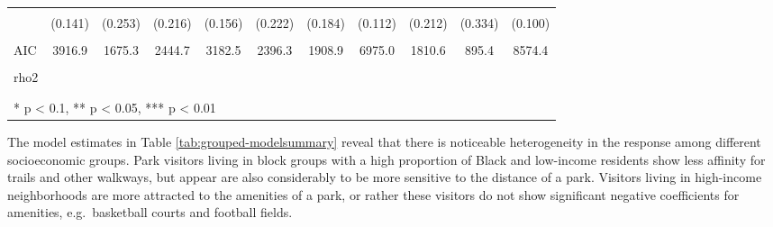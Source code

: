 \documentclass[3p, authoryear]{elsarticle} %
\begin{document}
\begin{landscape}
\begin{table}
{\begin{tabular}[t]{lcccccccccc}
\cellcolor{gray!6}{Other Sport} & \cellcolor{gray!6}{-0.036} & \cellcolor{gray!6}{-0.201} & \cellcolor{gray!6}{-0.417*} & \cellcolor{gray!6}{-0.125} & \cellcolor{gray!6}{-0.495**} & \cellcolor{gray!6}{0.010} & \cellcolor{gray!6}{-0.133} & \cellcolor{gray!6}{0.268} & \cellcolor{gray!6}{-0.417} & \cellcolor{gray!6}{-0.223**}\\
 & (0.141) & (0.253) & (0.216) & (0.156) & (0.222) & (0.184) & (0.112) & (0.212) & (0.334) & (0.100)\\
\midrule
\cellcolor{gray!6}{Num.Obs.} & \cellcolor{gray!6}{1355} & \cellcolor{gray!6}{561} & \cellcolor{gray!6}{743} & \cellcolor{gray!6}{1312} & \cellcolor{gray!6}{777} & \cellcolor{gray!6}{758} & \cellcolor{gray!6}{2436} & \cellcolor{gray!6}{544} & \cellcolor{gray!6}{358} & \cellcolor{gray!6}{3069}\\
AIC & 3916.9 & 1675.3 & 2444.7 & 3182.5 & 2396.3 & 1908.9 & 6975.0 & 1810.6 & 895.4 & 8574.4\\
\cellcolor{gray!6}{Log.Lik.} & \cellcolor{gray!6}{-1948.473} & \cellcolor{gray!6}{-827.668} & \cellcolor{gray!6}{-1212.336} & \cellcolor{gray!6}{-1581.241} & \cellcolor{gray!6}{-1188.142} & \cellcolor{gray!6}{-944.432} & \cellcolor{gray!6}{-3477.497} & \cellcolor{gray!6}{-895.280} & \cellcolor{gray!6}{-437.678} & \cellcolor{gray!6}{-4277.200}\\
rho2 &  &  &  &  &  &  &  &  &  & \\
\cellcolor{gray!6}{rho20} & \cellcolor{gray!6}{0.400} & \cellcolor{gray!6}{0.385} & \cellcolor{gray!6}{0.320} & \cellcolor{gray!6}{0.497} & \cellcolor{gray!6}{0.362} & \cellcolor{gray!6}{0.480} & \cellcolor{gray!6}{0.405} & \cellcolor{gray!6}{0.314} & \cellcolor{gray!6}{0.490} & \cellcolor{gray!6}{0.419}\\
\bottomrule
\multicolumn{11}{l}{\textsuperscript{} * p < 0.1, ** p < 0.05, *** p < 0.01}\\
\end{tabular}}
\end{table}
\end{landscape}

The model estimates in Table \ref{tab:grouped-modelsummary} reveal that there
is noticeable heterogeneity in the response among different socioeconomic
groups. Park visitors living in block groups with a high proportion of Black and
low-income residents show less affinity for trails and other walkways, but
appear are also considerably to be more sensitive to the distance of a park.
Visitors living in high-income neighborhoods are more attracted to the amenities
of a park, or rather these visitors do not show significant negative
coefficients for amenities, e.g.~basketball courts and football fields.
\end{document}
